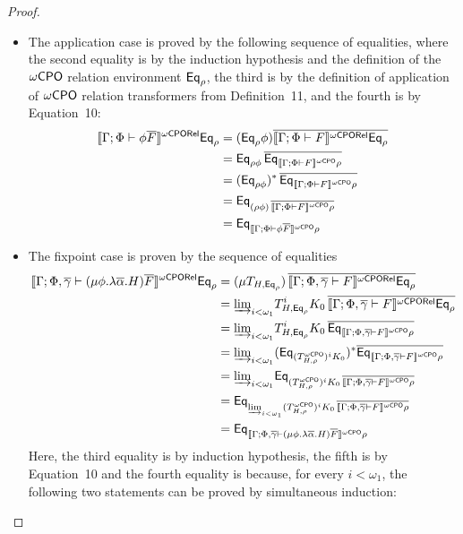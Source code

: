 \documentclass[acmsmall,review,anonymous]{acmart}
\theoremstyle{definition}
\begin{document}
\begin{proof}
\begin{itemize}
\item The application case is proved by the following sequence of
  equalities, where the second equality is by the induction hypothesis
  and the definition of the ${\omega\mathsf{CPO}}$ relation environment $\mathsf{Eq}_\rho$,
  the third is by the definition of application of ${\omega\mathsf{CPO}}$ relation
  transformers from Definition~11, and the fourth is by
  Equation~10:
\[
\begin{split}
\llbracket{\Gamma; \Phi \vdash \phi\overline{F}}\rrbracket^{{\omega\mathsf{CPORel}}}\mathsf{Eq}_{\rho} &=
(\mathsf{Eq}_{\rho}\phi)\overline{\llbracket{\Gamma; \Phi \vdash F}\rrbracket^{{\omega\mathsf{CPORel}}}
\mathsf{Eq}_{\rho}}\\
&= \mathsf{Eq}_{\rho \phi}\, \overline{\mathsf{Eq}_{\llbracket{\Gamma; \Phi \vdash F}\rrbracket^{{\omega\mathsf{CPO}}}
  \rho}}\\
&= (\mathsf{Eq}_{\rho \phi})^* \,\overline{\mathsf{Eq}_{\llbracket{\Gamma; \Phi \vdash F}\rrbracket^{{\omega\mathsf{CPO}}}
  \rho}}\\
&= \mathsf{Eq}_{(\rho \phi) \,\overline{\llbracket{\Gamma; \Phi \vdash F}\rrbracket^{{\omega\mathsf{CPO}}} \rho}}\\
&= \mathsf{Eq}_{\llbracket{\Gamma; \Phi \vdash \phi\overline{F}}\rrbracket^{{\omega\mathsf{CPO}}}\rho}
\end{split}
\]
\item 
  The fixpoint case is proven by the sequence of equalities
\[
\begin{split}
\llbracket{\Gamma; \Phi, \overline{\gamma} \vdash (\mu \phi.\lambda
  \overline{\alpha}. H)\overline{F}}\rrbracket^{{\omega\mathsf{CPORel}}}\mathsf{Eq}_{\rho} 
&=(\mu {T_{H, \mathsf{Eq}_{\rho}}}) \,\overline{\llbracket{\Gamma; \Phi, \overline{\gamma}
    \vdash F}\rrbracket^{{\omega\mathsf{CPORel}}}\mathsf{Eq}_{\rho}}\\   
&= {{\underrightarrow{\lim}}_{i < \omega_1}{T^i_{H, \mathsf{Eq}_{\rho}} K_0}}\, \overline{\llbracket{\Gamma;
    \Phi, \overline{\gamma} \vdash F}\rrbracket^{{\omega\mathsf{CPORel}}}\mathsf{Eq}_{\rho}}\\
&= {{\underrightarrow{\lim}}_{i < \omega_1}{ T^i_{H, \mathsf{Eq}_{\rho}} K_0 \,\overline{\mathsf{Eq}_{\llbracket{\Gamma;
    \Phi, \overline{\gamma}  \vdash F}\rrbracket^{{\omega\mathsf{CPO}}}\rho}}}}\\
&= {{\underrightarrow{\lim}}_{i < \omega_1}{(\mathsf{Eq}_{(T^{\omega\mathsf{CPO}}_{H,\rho})^i K_0})^*
  \overline{\mathsf{Eq}_{\llbracket{\Gamma; \Phi, \overline{\gamma}  \vdash F}\rrbracket^{{\omega\mathsf{CPO}}}\rho}}}}\\
&= {{\underrightarrow{\lim}}_{i < \omega_1}{\mathsf{Eq}_{(T^{\omega\mathsf{CPO}}_{H,\rho})^i K_0 \,\overline{\llbracket{\Gamma;
        \Phi, \overline{\gamma}  \vdash F}\rrbracket^{{\omega\mathsf{CPO}}}\rho}}}}\\ 
&= \mathsf{Eq}_{{{\underrightarrow{\lim}}_{i < \omega_1}{ (T^{\omega\mathsf{CPO}}_{H,\rho})^i K_0\,
    \overline{\llbracket{\Gamma; \Phi, \overline{\gamma}  \vdash F}\rrbracket^{{\omega\mathsf{CPO}}}\rho}}}}\\
&= \mathsf{Eq}_{\llbracket{\Gamma; \Phi, \overline{\gamma}  \vdash (\mu \phi.\lambda
      \overline{\alpha}. H)\overline{F}}\rrbracket^{{\omega\mathsf{CPO}}}\rho}
\end{split}
\]
Here, the third equality is by induction hypothesis, the fifth is by
Equation~10 and the fourth equality is because, for every $i < \omega_1$,
the following two statements can be proved by simultaneous induction:

\end{itemize}
\end{proof}
\end{document}
